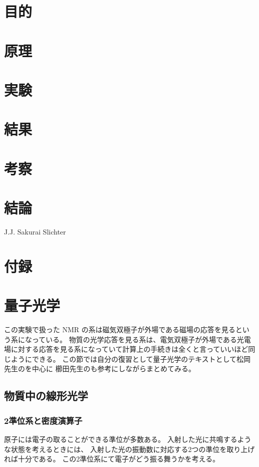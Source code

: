 \documentclass[11pt,dvipdfmx,a4paper]{jsarticle}
\begin{document}
\section{目的}

\section{原理}

\section{実験}

\section{結果}

\section{考察}

\section{結論}


J.J. Sakurai \cite{Sakurai_Napolitano_2020}
Slichter \cite{Slichter_1990}



\section*{付録}
\section{量子光学}
この実験で扱った NMR の系は磁気双極子が外場である磁場の応答を見るという系になっている。
物質の光学応答を見る系は、電気双極子が外場である光電場に対する応答を見る系になっていて計算上の手続きは全くと言っていいほど同じようにできる。
この節では自分の復習として量子光学のテキストとして松岡先生\cite{Matsuoka_2000}のを中心に
櫛田先生\cite{Kushida_1991}のも参考にしながらまとめてみる。
\subsection{物質中の線形光学}
\subsubsection{2準位系と密度演算子}
原子には電子の取ることができる準位が多数ある。
入射した光に共鳴するような状態を考えるときには、
入射した光の振動数に対応する2つの準位を取り上げれば十分である。
この2準位系にて電子がどう振る舞うかを考える。
\end{document}
